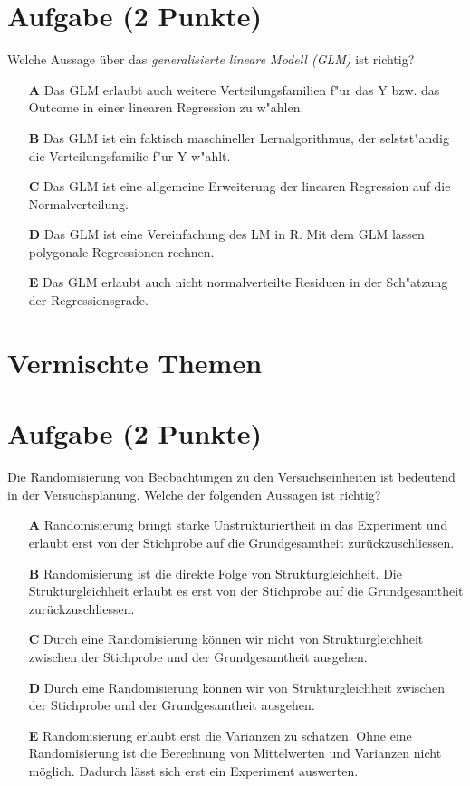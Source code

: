 \documentclass[a4paper, 9pt]{scrartcl}\usepackage[]{graphicx}\usepackage[]{xcolor}
\begin{document}
\section{Aufgabe \hfill (2 Punkte)}

Welche Aussage {\"u}ber das \textit{generalisierte lineare Modell (GLM)} ist richtig?  



\begin{enumerate}
\item [\textbf{A} \msquare] Das GLM erlaubt auch weitere Verteilungsfamilien f{"u}r das Y bzw. das Outcome in einer linearen Regression zu w{"a}hlen.
\item [\textbf{B} \msquare] Das GLM ist ein faktisch maschineller Lernalgorithmus, der selstst{"a}ndig die Verteilungsfamilie f{"u}r Y w{"a}hlt.
\item [\textbf{C} \msquare] Das GLM ist eine allgemeine Erweiterung der linearen Regression auf die Normalverteilung.
\item [\textbf{D} \msquare] Das GLM ist eine Vereinfachung des LM in R. Mit dem GLM lassen polygonale Regressionen rechnen.
\item [\textbf{E} \msquare] Das GLM erlaubt auch nicht normalverteilte Residuen in der Sch{"a}tzung der Regressionsgrade.
\end{enumerate}
\section*{Vermischte Themen}  

\section{Aufgabe \hfill (2 Punkte)}

Die Randomisierung von Beobachtungen zu den Versuchseinheiten
ist bedeutend in der Versuchsplanung. Welche der folgenden Aussagen ist richtig?



\begin{enumerate}
\item [\textbf{A} \msquare] Randomisierung bringt starke Unstrukturiertheit in das Experiment und erlaubt erst von der Stichprobe auf die Grundgesamtheit zurückzuschliessen.
\item [\textbf{B} \msquare] Randomisierung ist die direkte Folge von Strukturgleichheit. Die Strukturgleichheit erlaubt es erst von der Stichprobe auf die Grundgesamtheit zurückzuschliessen.
\item [\textbf{C} \msquare] Durch eine Randomisierung können wir nicht von Strukturgleichheit zwischen der Stichprobe und der Grundgesamtheit ausgehen.
\item [\textbf{D} \msquare] Durch eine Randomisierung können wir von Strukturgleichheit zwischen der Stichprobe und der Grundgesamtheit ausgehen.
\item [\textbf{E} \msquare] Randomisierung erlaubt erst die Varianzen zu schätzen. Ohne eine Randomisierung ist die Berechnung von Mittelwerten und Varianzen nicht möglich. Dadurch lässt sich erst ein Experiment auswerten.
\end{enumerate}
\end{document}

